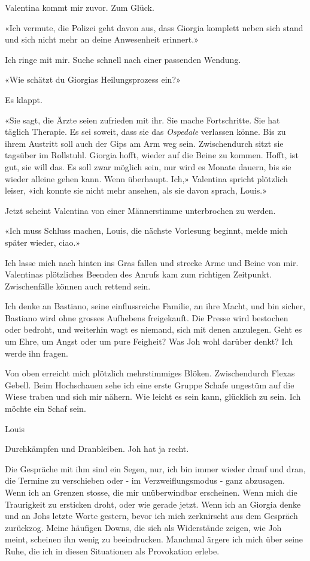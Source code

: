 Valentina kommt mir zuvor. Zum Glück.

«Ich vermute, die Polizei geht davon aus, dass Giorgia komplett neben
sich stand und sich nicht mehr an deine Anwesenheit erinnert.»

Ich ringe mit mir. Suche schnell nach einer passenden Wendung.

«Wie schätzt du Giorgias Heilungsprozess ein?»

Es klappt.

«Sie sagt, die Ärzte seien zufrieden mit ihr. Sie mache Fortschritte.
Sie hat täglich Therapie. Es sei soweit, dass sie das \emph{Ospedale}
verlassen könne. Bis zu ihrem Austritt soll auch der Gips am Arm weg
sein. Zwischendurch sitzt sie tagsüber im Rollstuhl. Giorgia hofft,
wieder auf die Beine zu kommen. Hofft, ist gut, sie will das. Es soll
zwar möglich sein, nur wird es Monate dauern, bis sie wieder alleine
gehen kann. Wenn überhaupt. Ich,» Valentina spricht plötzlich leiser,
«ich konnte sie nicht mehr ansehen, als sie davon sprach, Louis.»

Jetzt scheint Valentina von einer Männerstimme unterbrochen zu werden.

«Ich muss Schluss machen, Louis, die nächste Vorlesung beginnt, melde
mich später wieder, ciao.»

Ich lasse mich nach hinten ins Gras fallen und strecke Arme und Beine
von mir. Valentinas plötzliches Beenden des Anrufs kam zum richtigen
Zeitpunkt. Zwischenfälle können auch rettend sein.

Ich denke an Bastiano, seine einflussreiche Familie, an ihre Macht, und
bin sicher, Bastiano wird ohne grosses Aufhebens freigekauft. Die Presse
wird bestochen oder bedroht, und weiterhin wagt es niemand, sich mit
denen anzulegen. Geht es um Ehre, um Angst oder um pure Feigheit? Was
Joh wohl darüber denkt? Ich werde ihn fragen.

Von oben erreicht mich plötzlich mehrstimmiges Blöken. Zwischendurch
Flexas Gebell. Beim Hochschauen sehe ich eine erste Gruppe Schafe
ungestüm auf die Wiese traben und sich mir nähern. Wie leicht es sein
kann, glücklich zu sein. Ich möchte ein Schaf sein.

Louis

Durchkämpfen und Dranbleiben. Joh hat ja recht.

Die Gespräche mit ihm sind ein Segen, nur, ich bin immer wieder drauf
und dran, die Termine zu verschieben oder - im Verzweiflungsmodus - ganz
abzusagen. Wenn ich an Grenzen stosse, die mir unüberwindbar erscheinen.
Wenn mich die Traurigkeit zu ersticken droht, oder wie gerade jetzt.
Wenn ich an Giorgia denke und an Johs letzte Worte gestern, bevor ich
mich zerknirscht aus dem Gespräch zurückzog. Meine häufigen Downs, die
sich als Widerstände zeigen, wie Joh meint, scheinen ihn wenig zu
beeindrucken. Manchmal ärgere ich mich über seine Ruhe, die ich in
diesen Situationen als Provokation erlebe.

